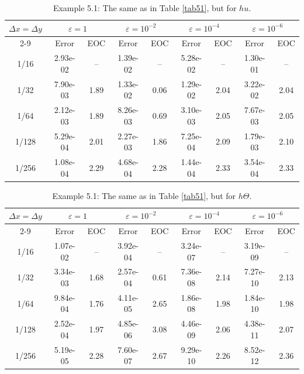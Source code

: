 \documentclass[a4paper,11pt,twoside]{article}
\numberwithin{equation}{section}
\numberwithin{figure}{section}
\numberwithin{table}{section}
\newcommand{\eps}{\varepsilon}
\newcommand{\dx}{\Delta x}
\newcommand{\dy}{\Delta y}
\begin{document}
\begin{example}
\begin{table}[ht!]
\begin{tabular}{|c|cc|cc|cc|cc|}
\hline
\multirow{2}{*}{$\dx=\dy$}&\multicolumn{2}{c|}{$\eps=1$}&\multicolumn{2}{c|}{$\eps=10^{-2}$}&\multicolumn{2}{c|}{$\eps=10^{-4}$}
& \multicolumn{2}{c|}{$\eps = 10^{-6}$} \\ 
\cline{2-9}
&Error&EOC&Error&EOC&Error&EOC&Error&EOC\\
\hline  		           
1/16 &2.93e-02& -- &1.39e-02& -- &5.28e-02& -- &1.30e-01& -- \\   
1/32 &7.90e-03&1.89&1.33e-02&0.06&1.29e-02&2.04&3.22e-02&2.04\\          
1/64 &2.12e-03&1.89&8.26e-03&0.69&3.10e-03&2.05&7.67e-03&2.05\\          
1/128&5.29e-04&2.01&2.27e-03&1.86&7.25e-04&2.09&1.79e-03&2.10\\
1/256&1.08e-04&2.29&4.68e-04&2.28&1.44e-04&2.33&3.54e-04&2.33\\
\hline
\end{tabular}
\caption{\sf Example 5.1: The same as in Table \ref{tab51}, but for $hu$.\label{tab52}}
\end{table}
\begin{table}[ht!]
\centering
\begin{tabular}{|c|cc|cc|cc|cc|}
\hline
\multirow{2}{*}{$\dx=\dy$}&\multicolumn{2}{c|}{$\eps=1$}&\multicolumn{2}{c|}{$\eps=10^{-2}$}&\multicolumn{2}{c|}{$\eps=10^{-4}$}
&\multicolumn{2}{c|}{$\eps=10^{-6}$} \\ 
\cline{2-9}
&Error&EOC&Error&EOC&Error&EOC&Error&EOC\\
\hline 		           
1/16 &1.07e-02& -- &3.92e-04& -- &3.24e-07& -- &3.19e-09& -- \\   
1/32 &3.34e-03&1.68&2.57e-04&0.61&7.36e-08&2.14&7.27e-10&2.13\\          
1/64 &9.84e-04&1.76&4.11e-05&2.65&1.86e-08&1.98&1.84e-10&1.98\\          
1/128&2.52e-04&1.97&4.85e-06&3.08&4.46e-09&2.06&4.38e-11&2.07\\
1/256&5.19e-05&2.28&7.60e-07&2.67&9.29e-10&2.26&8.52e-12&2.36\\
\hline
\end{tabular}
\caption{\sf Example 5.1: The same as in Table \ref{tab51}, but for $h\Theta$.\label{tab53}}
\end{table}	
\end{example}
\end{document}
